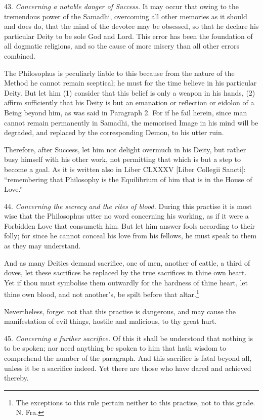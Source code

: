 43. \textit{Concerning a notable danger of Success.} It may occur that owing to the tremendous power of the Samadhi, overcoming all other memories as it should and does do, that the mind of the devotee may be obsessed, so that he declare his particular Deity to be sole God and Lord. This error has been the foundation of all dogmatic religions, and so the cause of more misery than all other errors combined.

The Philosophus is peculiarly liable to this because from the nature of the Method he cannot remain sceptical; he must for the time believe in his particular Deity. But let him (1) consider that this belief is only a weapon in his hands, (2) affirm sufficiently that his Deity is but an emanation or reflection or eidolon of a Being beyond him, as was said in Paragraph 2. For if he fail herein, since man cannot remain permanently in Samadhi, the memorised Image in his mind will be degraded, and replaced by the corresponding Demon, to his utter ruin.

Therefore, after Success, let him not delight overmuch in his Deity, but rather busy himself with his other work, not permitting that which is but a step to become a goal. As it is written also in Liber CLXXXV [Liber Collegii Sancti]: \enquote{remembering that Philosophy is the Equilibrium of him that is in the House of Love.}

44. \textit{Concerning the secrecy and the rites of blood.} During this practise it is most wise that the Philosophus utter no word concerning his working, as if it were a Forbidden Love that consumeth him. But let him answer fools according to their folly; for since he cannot conceal his love from his fellows, he must speak to them as they may understand.

And as many Deities demand sacrifice, one of men, another of cattle, a third of doves, let these sacrifices be replaced by the true sacrifices in thine own heart. Yet if thou must symbolise them outwardly for the hardness of thine heart, let thine own blood, and not another's, be spilt before that altar.\footnote{The exceptions to this rule pertain neither to this practise, not to this grade. N. Fra. \Argentium{}}

Nevertheless, forget not that this practise is dangerous, and may cause the manifestation of evil things, hostile and malicious, to thy great hurt.

45. \textit{Concerning a further sacrifice.} Of this it shall be understood that nothing is to be spoken; nor need anything be spoken to him that hath wisdom to comprehend the number of the paragraph. And this sacrifice is fatal beyond all, unless it be a sacrifice indeed. Yet there are those who have dared and achieved thereby.

